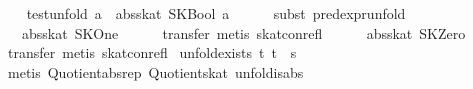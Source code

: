 \begin{isabellebody}
\ \ \isamarkupfalse%
\ {}test{}unfold\ a\ {}\ abs{}skat\ {}SKBool\ a{}{}\isanewline
\ \ \ \ \isamarkupfalse%
\ {}subst\ pred{}expr{}unfold{}\isanewline
{}\isamarkupfalse%
\isanewline
\ \ \isamarkupfalse%
\ {}{}\ {}\ abs{}skat\ SKOne{}\isanewline
\ \ \ \ \isamarkupfalse%
\ {}transfer{}\ metis\ skat{}con{}refl{}\isanewline
{}\isamarkupfalse%
\isanewline
\ \ \isamarkupfalse%
\ {}{}\ {}\ abs{}skat\ SKZero{}\isanewline
\ \ \ \ \isamarkupfalse%
\ {}transfer{}\ metis\ skat{}con{}refl{}\isanewline
{}\isamarkupfalse%
%
\endisatagproof
{\isafoldproof}%
%
\isadelimproof
\isanewline
%
\endisadelimproof
\isanewline
{}\isamarkupfalse%
\ unfold{}exists{}\ {}{}t{}\ {}t{}\ {}\ s{}\isanewline
%
\isadelimproof
\ \ %
\endisadelimproof
%
\isatagproof
{}\isamarkupfalse%
\ {}metis\ Quotient{}{}abs{}rep\ Quotient{}{}skat\ unfold{}is{}abs{}%

\end{isabellebody}
